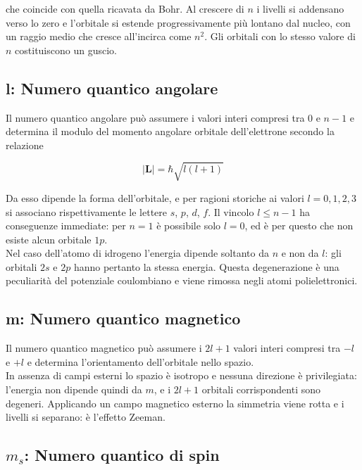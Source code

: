 che coincide con quella ricavata da Bohr. Al crescere di $n$ i livelli si addensano verso lo zero e l'orbitale si estende progressivamente più lontano dal nucleo, con un raggio medio che cresce all'incirca come $n^2$. Gli orbitali con lo stesso valore di $n$ costituiscono un guscio.

\subsection{l: Numero quantico angolare}

Il numero quantico angolare può assumere i valori interi compresi tra $0$ e $n-1$ e determina il modulo del momento angolare orbitale dell'elettrone secondo la relazione

\begin{equation}
    |\mathbf{L}| = \hbar \sqrt{l(l+1)}
    \label{eq:momento_angolare}
\end{equation}

Da esso dipende la forma dell'orbitale, e per ragioni storiche ai valori $l = 0, 1, 2, 3$ si associano rispettivamente le lettere $s$, $p$, $d$, $f$. Il vincolo $l \leq n-1$ ha conseguenze immediate: per $n=1$ è possibile solo $l=0$, ed è per questo che non esiste alcun orbitale $1p$.\\

Nel caso dell'atomo di idrogeno l'energia dipende soltanto da $n$ e non da $l$: gli orbitali $2s$ e $2p$ hanno pertanto la stessa energia. Questa degenerazione è una peculiarità del potenziale coulombiano e viene rimossa negli atomi polielettronici.

\subsection{m: Numero quantico magnetico}

Il numero quantico magnetico può assumere i $2l+1$ valori interi compresi tra $-l$ e $+l$ e determina l'orientamento dell'orbitale nello spazio.\\

In assenza di campi esterni lo spazio è isotropo e nessuna direzione è privilegiata: l'energia non dipende quindi da $m$, e i $2l+1$ orbitali corrispondenti sono degeneri. Applicando un campo magnetico esterno la simmetria viene rotta e i livelli si separano: è l'effetto Zeeman.

\subsection{$m_s$: Numero quantico di spin}

